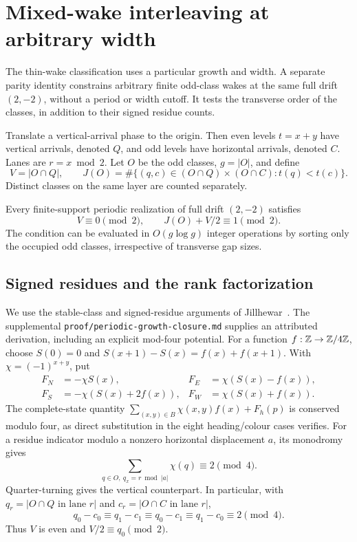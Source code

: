 \section{Mixed-wake interleaving at arbitrary width}
\label{app:mixed}
The thin-wake classification uses a particular growth and width. A separate
parity identity constrains arbitrary finite odd-class wakes at the same full
drift \((2,-2)\), without a period or width cutoff. It tests the transverse
order of the classes, in addition to their signed residue counts.

Translate a vertical-arrival phase to the origin. Then even levels
\(t=x+y\) have vertical arrivals, denoted \(Q\), and odd levels have
horizontal arrivals, denoted \(C\). Lanes are \(r=x\bmod2\). Let \(O\)
be the odd classes, \(g=|O|\), and define
\[
 V=|O\cap Q|,\qquad
 J(O)=\#\{(q,c)\in(O\cap Q)\times(O\cap C):t(q)<t(c)\}.
\]
Distinct classes on the same layer are counted separately.

\begin{theorem}\label{thm:mixed}
Every finite-support periodic realization of full drift \((2,-2)\) satisfies
\[
 V\equiv0\pmod2,\qquad J(O)+V/2\equiv1\pmod2.
\]
The condition can be evaluated in \(O(g\log g)\) integer operations by sorting
only the occupied odd classes, irrespective of transverse gap sizes.
\end{theorem}

\subsection{Signed residues and the rank factorization}
We use the stable-class and signed-residue arguments of
Jillhewar~\cite[Section~7, ``Signed mod-four wake-residue identity'', and the proof of ``Even-diagonal growth four is impossible'', equation labelled \texttt{eq:diagK}]{Jillhewar2026}. The supplemental
\texttt{proof/periodic-growth-closure.md} supplies an attributed derivation,
including an explicit mod-four potential. For a function
\(f:\mathbb Z\to\mathbb Z/4\mathbb Z\), choose \(S(0)=0\) and
\(S(x+1)-S(x)=f(x)+f(x+1)\). With \(\chi=(-1)^{x+y}\), put
\[
\begin{aligned}
 F_N&=-\chi S(x),&F_E&=\chi(S(x)-f(x)),\\
 F_S&=-\chi(S(x)+2f(x)),&F_W&=\chi(S(x)+f(x)).
\end{aligned}
\]
The complete-state quantity
\(\sum_{(x,y)\in B}\chi(x,y)f(x)+F_h(p)\) is conserved modulo four,
as direct substitution in the eight heading/colour cases verifies.
For a residue indicator modulo a nonzero horizontal displacement \(a\),
its monodromy gives
\[
 \sum_{q\in O,\ q_x=r\bmod|a|}\chi(q)\equiv2\pmod4.
\]
Quarter-turning gives the vertical counterpart. In particular, with
\(q_r=|O\cap Q\text{ in lane }r|\) and
\(c_r=|O\cap C\text{ in lane }r|\),
\[
 q_0-c_0\equiv q_1-c_1\equiv q_0-c_1\equiv q_1-c_0\equiv2\pmod4.
\]
Thus \(V\) is even and \(V/2\equiv q_0\pmod2\).

